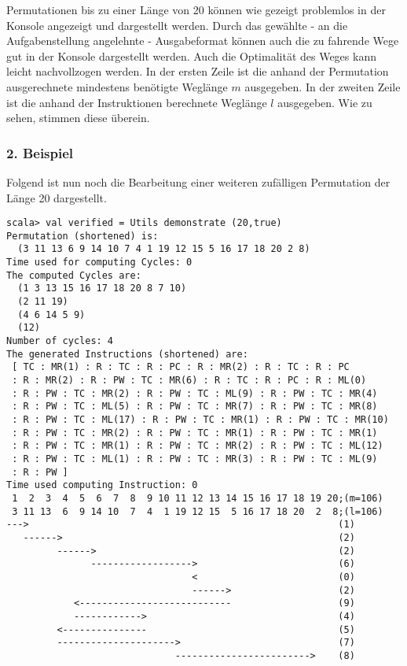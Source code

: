 Permutationen bis zu einer Länge von 20 können wie gezeigt problemlos in der Konsole angezeigt und dargestellt werden.
Durch das gewählte - an die Aufgabenstellung angelehnte - Ausgabeformat können auch die zu fahrende Wege gut in der Konsole dargestellt werden.
Auch die Optimalität des Weges kann leicht nachvollzogen werden.
In der ersten Zeile ist die anhand der Permutation ausgerechnete mindestens benötigte Weglänge $m$ ausgegeben.
In der zweiten Zeile ist die anhand der Instruktionen berechnete Weglänge $l$ ausgegeben. Wie zu sehen, stimmen diese überein.
\subsubsection*{2. Beispiel}
Folgend ist nun noch die Bearbeitung einer weiteren zufälligen Permutation der Länge 20 dargestellt.
\begin{lstlisting}
scala> val verified = Utils demonstrate (20,true)
Permutation (shortened) is:
  (3 11 13 6 9 14 10 7 4 1 19 12 15 5 16 17 18 20 2 8)
Time used for computing Cycles: 0
The computed Cycles are: 
  (1 3 13 15 16 17 18 20 8 7 10)
  (2 11 19)
  (4 6 14 5 9)
  (12)
Number of cycles: 4
The generated Instructions (shortened) are: 
 [ TC : MR(1) : R : TC : R : PC : R : MR(2) : R : TC : R : PC
 : R : MR(2) : R : PW : TC : MR(6) : R : TC : R : PC : R : ML(0)
 : R : PW : TC : MR(2) : R : PW : TC : ML(9) : R : PW : TC : MR(4)
 : R : PW : TC : ML(5) : R : PW : TC : MR(7) : R : PW : TC : MR(8)
 : R : PW : TC : ML(17) : R : PW : TC : MR(1) : R : PW : TC : MR(10)
 : R : PW : TC : MR(2) : R : PW : TC : MR(1) : R : PW : TC : MR(1)
 : R : PW : TC : MR(1) : R : PW : TC : MR(2) : R : PW : TC : ML(12)
 : R : PW : TC : ML(1) : R : PW : TC : MR(3) : R : PW : TC : ML(9)
 : R : PW ] 
Time used computing Instruction: 0
 1  2  3  4  5  6  7  8  9 10 11 12 13 14 15 16 17 18 19 20;(m=106)
 3 11 13  6  9 14 10  7  4  1 19 12 15  5 16 17 18 20  2  8;(l=106)
--->                                                       (1)
   ------>                                                 (2)
         ------>                                           (2)
               ------------------>                         (6)
                                 <                         (0)
                                 ------>                   (2)
            <---------------------------                   (9)
            ------------>                                  (4)
         <---------------                                  (5)
         --------------------->                            (7)
                              ------------------------>    (8)

\end{lstlisting}
